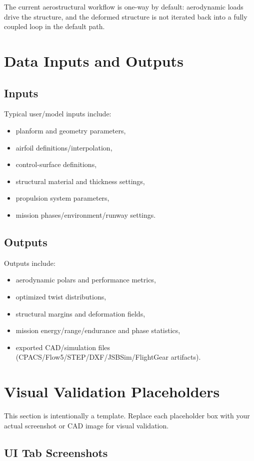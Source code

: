 ﻿\documentclass[11pt]{article}
\begin{document}
The current aerostructural workflow is one-way by default: aerodynamic loads drive the structure, and the deformed structure is not iterated back into a fully coupled loop in the default path.

\section{Data Inputs and Outputs}
\subsection{Inputs}
Typical user/model inputs include:
\begin{itemize}
\item planform and geometry parameters,
\item airfoil definitions/interpolation,
\item control-surface definitions,
\item structural material and thickness settings,
\item propulsion system parameters,
\item mission phases/environment/runway settings.
\end{itemize}

\subsection{Outputs}
Outputs include:
\begin{itemize}
\item aerodynamic polars and performance metrics,
\item optimized twist distributions,
\item structural margins and deformation fields,
\item mission energy/range/endurance and phase statistics,
\item exported CAD/simulation files (CPACS/Flow5/STEP/DXF/JSBSim/FlightGear artifacts).
\end{itemize}

\section{Visual Validation Placeholders}
This section is intentionally a template. Replace each placeholder box with your actual screenshot or CAD image for visual validation.

\subsection{UI Tab Screenshots}
\end{document}
